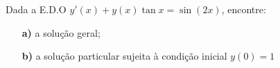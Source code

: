 \linespread{1.5}
Dada a E.D.O $y'(x) + y(x)\tan{x} = \sin{(2x)}$, encontre:
\begin{itemize}
    \item[\textbf{a)}] a solução geral;
    \item[\textbf{b)}] a solução particular sujeita à condição inicial $y(0) = 1$
\end{itemize}